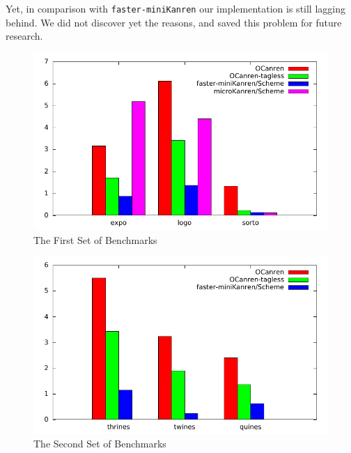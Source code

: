 Yet, in comparison with \texttt{faster-miniKanren} our implementation is still lagging behind. We did not discover yet the
reasons, and saved this problem for future research.

\begin{figure}[t]
\centering
\includegraphics{graph1.pdf}
\caption{The First Set of Benchmarks}
\label{eval:first}
\end{figure}

\begin{figure}[h]
\centering
\includegraphics{graph2.pdf}
\caption{The Second Set of Benchmarks}
\label{eval:second}
\end{figure}
